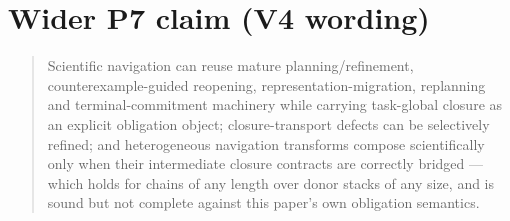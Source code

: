 \section{Wider P7 claim (V4 wording)}

\begin{quote}
Scientific navigation can reuse mature planning/refinement,
counterexample-guided reopening, representation-migration, replanning and
terminal-commitment machinery while carrying task-global closure as an explicit
obligation object; closure-transport defects can be selectively refined; and
heterogeneous navigation transforms compose scientifically only when their
intermediate closure contracts are correctly bridged --- which holds for chains
of any length over donor stacks of any size, and is sound but not complete
against this paper's own obligation semantics.
\end{quote}
